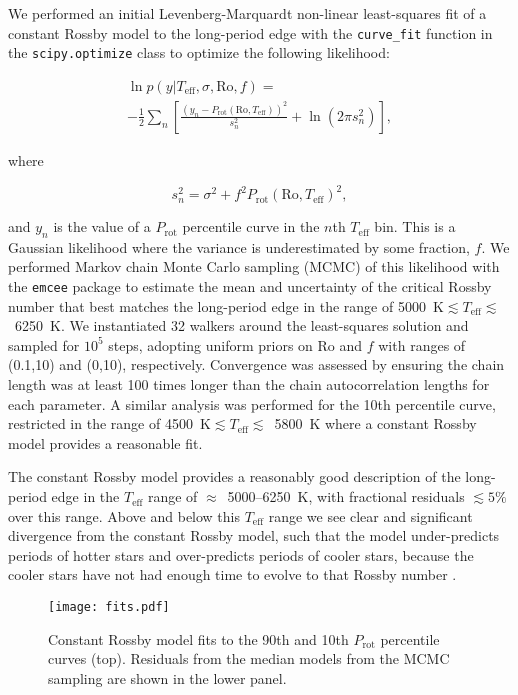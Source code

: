 \documentclass[linenumbers,tighten,trackchanges,twocolumn]{aastex631}
\newcommand{\teff}{\ensuremath{T_{\mathrm{eff}}}\xspace}
\newcommand{\prot}{\ensuremath{P_\mathrm{rot}}\xspace}
\begin{document}
We performed an initial Levenberg-Marquardt non-linear least-squares fit of a constant Rossby model to the long-period edge with the \texttt{curve\_fit} function in the \texttt{scipy.optimize} class to optimize the following likelihood: 

\begin{multline}
    \ln{p} (y | T_\mathrm{eff}, \sigma, \mathrm{Ro}, f) =\\ -\frac{1}{2}\sum_n \left [ \frac{(y_n - P_\mathrm{rot}(\mathrm{Ro}, T_\mathrm{eff}))^2}{s_n^2}  + \ln{(2\pi s_n^2)} \right ],
\end{multline}

where

\begin{equation}
    s_n^2 = \sigma^2 + f^2 P_\mathrm{rot}(\mathrm{Ro}, T_\mathrm{eff})^2,
\end{equation}

and $y_n$ is the value of a \prot percentile curve in the $n$th \teff bin. This is a Gaussian likelihood where the variance is underestimated by some fraction, $f$. We performed Markov chain Monte Carlo sampling (MCMC) of this likelihood with the \texttt{emcee} package \citep{emcee2013, emcee2019} to estimate the mean and uncertainty of the critical Rossby number that best matches the long-period edge in the range of 5000~K$\lesssim \teff \lesssim$~6250~K. We instantiated 32 walkers around the least-squares solution and sampled for $10^5$ steps, adopting uniform priors on Ro and $f$ with ranges of (0.1,10) and (0,10), respectively. Convergence was assessed by ensuring the chain length was at least 100 times longer than the chain autocorrelation lengths for each parameter. A similar analysis was performed for the 10th percentile curve, restricted in the range of 4500~K$\lesssim \teff \lesssim$~5800~K where a constant Rossby model provides a reasonable fit.

The constant Rossby model provides a reasonably good description of the long-period edge in the \teff range of $\approx$~5000--6250~K, with fractional residuals $\lesssim5\%$ over this range. Above and below this \teff range we see clear and significant divergence from the constant Rossby model, such that the model under-predicts periods of hotter stars and over-predicts periods of cooler stars, because the cooler stars have not had enough time to evolve to that Rossby number \citep[see Figure 6 in][]{vanSaders2019}.

\begin{figure}
    \centering
    \texttt{[image: fits.pdf]}
    \caption{Constant Rossby model fits to the 90th and 10th \prot percentile curves (top). Residuals from the median models from the MCMC sampling are shown in the lower panel.}
    \label{fig:fits}
\end{figure}
\end{document}
